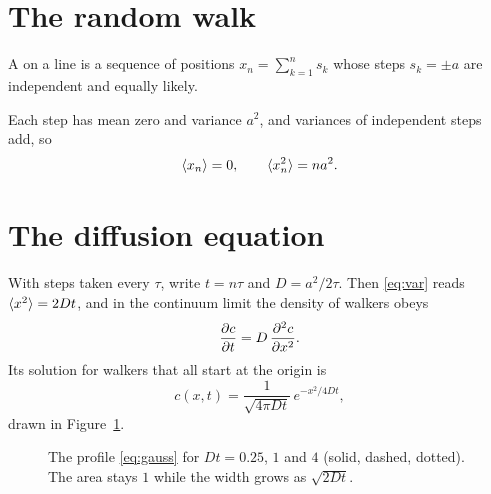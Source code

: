 \documentclass[11pt]{article}
\begin{document}
{\small\tableofcontents}


\section{The random walk}\label{sec:walk}

\begin{definition}\label{def:walk}
A  on a line is a sequence of positions
$x_n = \sum_{k=1}^{n} s_k$ whose steps $s_k=\pm a$ are independent and equally
likely.
\end{definition}

Each step has mean zero and variance $a^2$, and variances of independent steps
add, so
\begin{equation}\label{eq:var}
  \langle x_n \rangle = 0, \qquad \langle x_n^2 \rangle = n a^2 .
\end{equation}


\section{The diffusion equation}\label{sec:diffusion}

With steps taken every $\tau$, write $t=n\tau$ and $D=a^2/2\tau$. Then
\eqref{eq:var} reads $\langle x^2 \rangle=2Dt$, and in the continuum limit the density
of walkers obeys
\begin{equation}\label{eq:diffeq}
  \frac{\partial c}{\partial t} = D\,\frac{\partial^2 c}{\partial x^2}.
\end{equation}
Its solution for walkers that all start at the origin is
\begin{equation}\label{eq:gauss}
  c(x,t) = \frac{1}{\sqrt{4\pi D t}}\, e^{-x^2/4Dt},
\end{equation}
drawn in Figure~\ref{fig:diffusion}.

\begin{figure}[ht]
  \centering
  \figDiffusion
  \caption{The profile \eqref{eq:gauss} for $Dt=0.25$, $1$ and $4$ (solid,
  dashed, dotted). The area stays $1$ while the width grows as $\sqrt{2Dt}$.}
  \label{fig:diffusion}
\end{figure}
\end{document}
